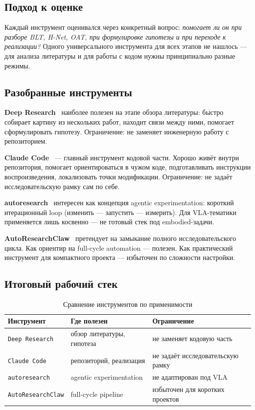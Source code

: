 \documentclass[12pt,a4paper]{article}
\begin{document}
\subsection{Подход к оценке}

Каждый инструмент оценивался через конкретный вопрос: \textit{помогает ли он при
разборе BLT, H-Net, OAT, при формулировке гипотезы и при переходе к реализации?}
Одного универсального инструмента для всех этапов не нашлось --- для анализа
литературы и для работы с кодом нужны принципиально разные режимы.

\subsection{Разобранные инструменты}

\textbf{Deep Research}~\cite{deepresearch} наиболее полезен на этапе обзора литературы:
быстро собирает картину из нескольких работ, находит связи между ними, помогает
сформулировать гипотезу. Ограничение: не заменяет инженерную работу с репозиторием.

\textbf{Claude Code}~\cite{claudecode} --- главный инструмент кодовой части. Хорошо
живёт внутри репозитория, помогает ориентироваться в чужом коде, подготавливать
инструкции воспроизведения, локализовать точки модификации. Ограничение: не задаёт
исследовательскую рамку сам по себе.

\textbf{autoresearch}~\cite{autoresearch} интересен как концепция agentic
experimentation: короткий итерационный loop (изменить --- запустить --- измерить).
Для VLA-тематики применяется лишь косвенно --- не готовый стек под embodied-задачи.

\textbf{AutoResearchClaw}~\cite{autoresearchclaw} претендует на замыкание полного
исследовательского цикла. Как ориентир на full-cycle automation --- полезен.
Как практический инструмент для компактного проекта --- избыточен по сложности настройки.

\subsection{Итоговый рабочий стек}

\begin{table}[h!]
\centering
\caption{Сравнение инструментов по применимости}
\begin{tabular}{p{3.2cm} p{4.4cm} p{5.6cm}}
\toprule
\textbf{Инструмент} & \textbf{Где полезен} & \textbf{Ограничение} \\
\midrule
\texttt{Deep Research}    & обзор литературы, гипотеза      & не заменяет кодовую часть \\
\texttt{Claude Code}      & репозиторий, реализация         & не задаёт исследовательскую рамку \\
\texttt{autoresearch}     & agentic experimentation         & не адаптирован под VLA \\
\texttt{AutoResearchClaw} & full-cycle pipeline             & избыточен для коротких проектов \\
\bottomrule
\end{tabular}
\end{table}
\end{document}
